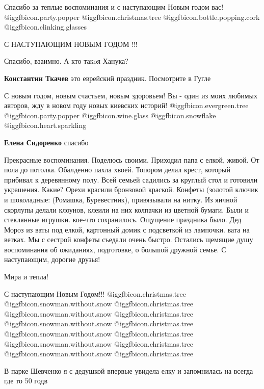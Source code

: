 \begin{itemize}

Спасибо за теплые воспоминания и с наступающим Новым годом вас!
@igg{fbicon.party.popper}  @igg{fbicon.christmas.tree}
@igg{fbicon.bottle.popping.cork}  @igg{fbicon.clinking.glasses} 

С НАСТУПАЮЩИМ НОВЫМ ГОДОМ !!!

Спасибо, взаимно. А кто такoя Ханука?

\textbf{Константин Ткачев} это еврейский праздник. Посмотрите в Гугле


С новым годом, новым счастьем, новым здоровьем! Вы - один из моих любимых
авторов, жду в новом году новых киевских историй! 
@igg{fbicon.evergreen.tree}  @igg{fbicon.party.popper}  @igg{fbicon.wine.glass}
@igg{fbicon.snowflake} @igg{fbicon.heart.sparkling} 

\textbf{Елена Сидоренко} спасибо


Прекрасные воспоминания. Поделюсь своими. Приходил папа с елкой, живой. От пола
до потолка. Обалденно пахла хвоей. Топором делал крест, который прибивал к
деревянному полу. Всей семьей садились за круглый стол и готовили украшения.
Какие? Орехи красили бронзовой краской. Конфеты (золотой ключик и шоколадные:
(Ромашка, Буревестник), привязывали на нитку. Из яичной скорлупы делали
клоунов, клеили на них колпачки из цветной бумаги. Были и стеклянные игрушки.
кое-что сохранилось. Ощущение праздника было. Дед Мороз из ваты под елкой,
картонный домик с подсветкой из лампочки. вата на ветках. Мы с сестрой конфеты
съедали очень быстро. Остались щемящие душу воспоминания об ожиданиях,
подготовке, о большой дружной семье. С наступающим, дорогие друзья!


Мира и тепла!

С наступающим Новым Годом!!!
 @igg{fbicon.christmas.tree} @igg{fbicon.snowman.without.snow} @igg{fbicon.christmas.tree} @igg{fbicon.snowman.without.snow} @igg{fbicon.christmas.tree} @igg{fbicon.snowman.without.snow}
 @igg{fbicon.christmas.tree} @igg{fbicon.snowman.without.snow} @igg{fbicon.christmas.tree} @igg{fbicon.snowman.without.snow} @igg{fbicon.christmas.tree} @igg{fbicon.snowman.without.snow} @igg{fbicon.christmas.tree} 

В парке Шевченко я с дедушкой впервые увидела елку и запомнилась на всегда где то 50 годв


\end{itemize}
